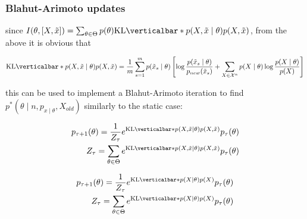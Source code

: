 \documentclass{article}
\newcommand{\KL}[2]{\mathrm{KL} \verticalbar*{#1}{#2} }  %
\begin{document}
\subsubsection{Blahut-Arimoto updates}

since $I(\theta,  \left[X, \tilde{x} \right]) = \sum_{\theta \in \Theta} p(\theta) \KL{p(X, \tilde{x} \mid \theta)}{p(X, \tilde{x})}$, from the above it is obvious that 

\begin{equation}
   \KL{p(X, \tilde{x} \mid \theta)}{p(X, \tilde{x})} = \frac{1}{m}\sum_{s=1}^m  p(\tilde{x}_s \mid \theta) \left[ \log \frac{p(\tilde{x}_s \mid \theta)}{p_{new}(\tilde{x}_s)} + \sum_{X \in \mathcal{X}^n} p(X \mid \theta) \log \frac{p(X \mid \theta)}{p(X)} \right] 
\end{equation}

this can be used to implement a Blahut-Arimoto iteration to find $p^*(\theta \mid n, p_{x \mid \theta}, X_{old})$ similarly to the static case:

\begin{eqnarray}
    p_{\tau+1}(\theta) = \frac{1}{Z_\tau} e^{\KL{p(X, \tilde{x} \mid \theta)}{p(X, \tilde{x})}} p_\tau(\theta) \\
    Z_\tau = \sum_{\theta \in \Theta} e^{\KL{p(X, \tilde{x} \mid \theta)}{p(X, \tilde{x})}} p_\tau(\theta)
\end{eqnarray}

\begin{eqnarray}
    p_{\tau+1}(\theta) = \frac{1}{Z_\tau} e^{\KL{p(X \mid \theta)}{p(X)}} p_\tau(\theta) \\
    Z_\tau = \sum_{\theta \in \Theta} e^{\KL{p(X \mid \theta)}{p(X)}} p_\tau(\theta)
\end{eqnarray}



\end{document}
